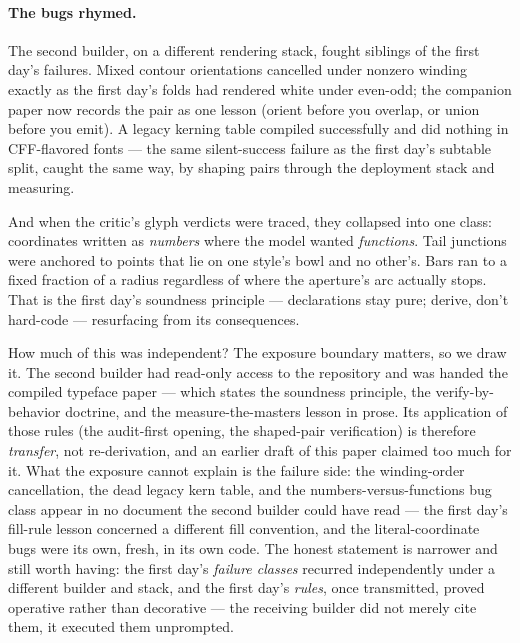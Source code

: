 \documentclass[11pt]{article}
\begin{document}
\paragraph{The bugs rhymed.} The second builder, on a different rendering stack, fought siblings of the first day's failures. Mixed contour orientations cancelled under nonzero winding exactly as the first day's folds had rendered white under even-odd; the companion paper now records the pair as one lesson (orient before you overlap, or union before you emit). A legacy kerning table compiled successfully and did nothing in CFF-flavored fonts — the same silent-success failure as the first day's subtable split, caught the same way, by shaping pairs through the deployment stack and measuring.

And when the critic's glyph verdicts were traced, they collapsed into one class: coordinates written as \emph{numbers} where the model wanted \emph{functions}. Tail junctions were anchored to points that lie on one style's bowl and no other's. Bars ran to a fixed fraction of a radius regardless of where the aperture's arc actually stops. That is the first day's soundness principle — declarations stay pure; derive, don't hard-code — resurfacing from its consequences.

How much of this was independent? The exposure boundary matters, so we draw it. The second builder had read-only access to the repository and was handed the compiled typeface paper — which states the soundness principle, the verify-by-behavior doctrine, and the measure-the-masters lesson in prose. Its application of those rules (the audit-first opening, the shaped-pair verification) is therefore \emph{transfer}, not re-derivation, and an earlier draft of this paper claimed too much for it. What the exposure cannot explain is the failure side: the winding-order cancellation, the dead legacy kern table, and the numbers-versus-functions bug class appear in no document the second builder could have read — the first day's fill-rule lesson concerned a different fill convention, and the literal-coordinate bugs were its own, fresh, in its own code. The honest statement is narrower and still worth having: the first day's \emph{failure classes} recurred independently under a different builder and stack, and the first day's \emph{rules}, once transmitted, proved operative rather than decorative — the receiving builder did not merely cite them, it executed them unprompted.
\end{document}

